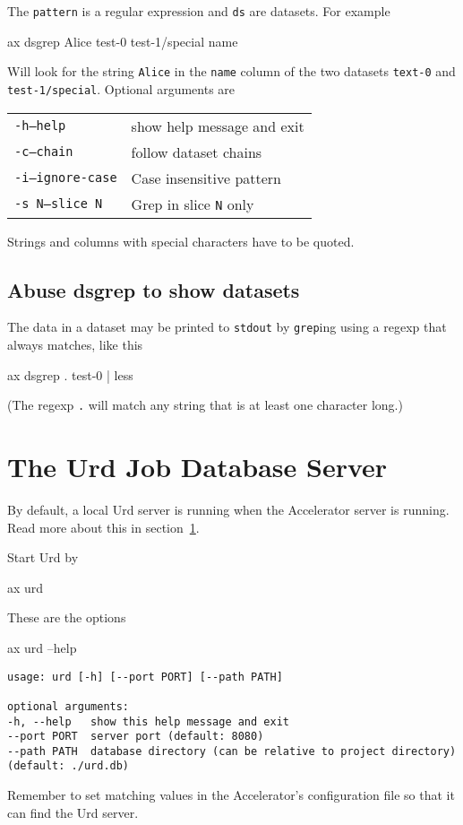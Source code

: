 The \texttt{pattern} is a regular expression and \texttt{ds} are
datasets.  For example
\begin{shell}
ax dsgrep Alice test-0 test-1/special name
\end{shell}
Will look for the string \texttt{Alice} in the \texttt{name} column of
the two datasets \texttt{text-0} and \texttt{test-1/special}.
Optional arguments are
\begin{snugshade}
  \begin{tabular}{p{4cm}p{9cm}}
      \texttt{-h}\hspace{3cm}\texttt{---help} & show help message and exit\\[4ex]
      \texttt{-c}\hspace{3cm}\texttt{---chain} & follow dataset chains\\[4ex]
      \texttt{-i}\hspace{3cm}\texttt{---ignore-case} & Case insensitive pattern\\[4ex]
      \texttt{-s N}\hspace{3cm}\texttt{---slice N} & Grep in slice \texttt{N} only\\
  \end{tabular}
\end{snugshade}
Strings and columns with special characters have to be quoted.



\subsection{Abuse dsgrep to show datasets}
The data in a dataset may be printed to \texttt{stdout} by
\texttt{grep}ing using a regexp that always matches, like this
\begin{shell}
ax dsgrep . test-0 | less
\end{shell}
(The regexp \texttt{.} will match any string that is at least one character long.)




\section{The Urd Job Database Server}
By default, a local Urd server is running when the Accelerator server
is running.  Read more about this in section~\ref{}.

Start Urd by
\begin{shell}
ax urd
\end{shell}
These are the options
\begin{shell}
ax urd --help
\end{shell}
\begin{snugshade}
\begin{verbatim}
usage: urd [-h] [--port PORT] [--path PATH]

optional arguments:
-h, --help   show this help message and exit
--port PORT  server port (default: 8080)
--path PATH  database directory (can be relative to project directory)
(default: ./urd.db)
\end{verbatim}
\end{snugshade}
Remember to set matching values in the Accelerator's configuration
file so that it can find the Urd server.


